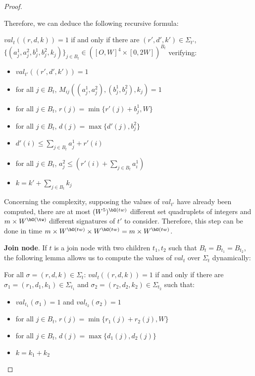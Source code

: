 \documentclass[11pt,letterpaper]{article}
\begin{document}
\begin{proof}
\begin{nestedproof}
    Therefore, we can deduce the following recursive formula:

    $val_t((r,d,k))=1$ if and only if there are $(r',d',k')\in \Sigma_{t'}$, $\{(a_j^1,a_j^2,b_j^1,b_j^2,k_j)\}_{j\in B_t}\in ([O,W]^4\times[0,2W])^{B_t}$  verifying: \begin{itemize}
        \item $val_{t'}((r',d',k'))=1$
        \item for all $j\in B_t$, $M_{ij}((a_j^1,a_j^2),(b_j^1,b_j^2),k_j)=1$
        \item for all $j\in B_t$, $r(j)=\min\{r'(j)+b_j^1,W\}$
        \item for all $j\in B_t$, $d(j)=\max\{d'(j),b_j^2\}$
        \item $d'(i)\leq\sum_{j\in B_t}a_j^1+r'(i)$
        \item for all $j\in B_t$, $a_j^2\leq(r'(i)+\sum_{j\in B_t}a_i^1)$
        \item $k=k'+\sum_{j\in B_t}k_j$
    \end{itemize}

    \end{nestedproof}

    Concerning the complexity, supposing the values of $val_{t'}$ have already been computed, there are at most $(W^5)^{\bO(tw)}$ different set quadruplets of integers and $m\times W^{\bO(\tw)}$ different signatures of $t'$ to consider. Therefore, this step can be done in time $m\times W^{\bO(tw)}\times W^{\bO(tw)}=m\times W^{\bO(tw)}$.
    \medskip

    \textbf{Join node}. If $t$ is a join node with two children $t_1,t_2$ such that $B_t=B_{t_1}=B_{t_2}$, the following lemma allows us to compute the values of $val_t$ over $\Sigma_t$ dynamically:

    \begin{lemma}
    For all $\sigma=(r,d,k)\in\Sigma_t$:
    $val_t((r,d,k))=1$ if and only if there are
     $\sigma_1=(r_1,d_1,k_1)\in \Sigma_{t_1}$ and $\sigma_2=(r_2,d_2,k_2)\in \Sigma_{t_2}$ such that:
    \begin{itemize}
        \item $val_{t_1}(\sigma_1)=1$ and $val_{t_2}(\sigma_2)=1$
        \item for all $j\in B_t$, $r(j)=\min\{r_1(j)+r_2(j),W\}$
        \item for all $j\in B_t$, $d(j)=\max\{d_1(j),d_2(j)\}$
        \item $k=k_1+k_2$
    \end{itemize}


\end{lemma}
\end{proof}
\end{document}
